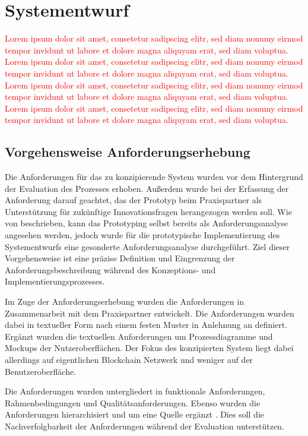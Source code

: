 \section{Systementwurf}
\textcolor{red}{Lorem ipsum dolor sit amet, consetetur sadipscing elitr, sed diam nonumy eirmod tempor invidunt ut labore et dolore magna aliquyam erat, sed diam voluptua. Lorem ipsum dolor sit amet, consetetur sadipscing elitr, sed diam nonumy eirmod tempor invidunt ut labore et dolore magna aliquyam erat, sed diam voluptua. Lorem ipsum dolor sit amet, consetetur sadipscing elitr, sed diam nonumy eirmod tempor invidunt ut labore et dolore magna aliquyam erat, sed diam voluptua. Lorem ipsum dolor sit amet, consetetur sadipscing elitr, sed diam nonumy eirmod tempor invidunt ut labore et dolore magna aliquyam erat, sed diam voluptua.}

\subsection{Vorgehensweise Anforderungserhebung}
Die Anforderungen für das zu konzipierende System wurden vor dem Hintergrund der Evaluation des Prozesses erhoben. Außerdem wurde bei der Erfassung der Anforderung darauf geachtet, das der Prototyp beim Praxispartner als Unterstützung für zukünftige Innovationsfragen herangezogen werden soll. Wie von \citet{Dick2017, HullElizabeth2011} beschrieben, kann das Prototyping selbst bereits als Anforderungsanalyse angesehen werden, jedoch wurde für die prototypische Implementierung des Systementwurfs eine gesonderte Anforderungsanalyse durchgeführt. Ziel dieser Vorgehensweise ist eine präzise Definition und Eingrenzung der Anforderungsbeschreibung während des Konzeptions- und Implementierungsprozesses.

Im Zuge der Anforderungserhebung wurden die Anforderungen in Zusammenarbeit mit dem Praxispartner entwickelt. Die Anforderungen wurden dabei in textueller Form nach einem festen Muster in Anlehnung an \citet{PohlKlaus2015} definiert. Ergänzt wurden die textuellen Anforderungen um Prozessdiagramme und Mockups der Nutzeroberflächen. Der Fokus des konzipierten System liegt dabei allerdings auf eigentlichen Blockchain Netzwerk und weniger auf der Benutzeroberfläche.

Die Anforderungen wurden untergliedert in funktionale Anforderungen, Rahmenbedingungen und Qualitätsanforderungen. Ebenso wurden die Anforderungen hierarchisiert und um eine Quelle ergänzt \citep{Koelsch2016}. Dies soll die Nachverfolgbarkeit der Anforderungen während der Evaluation unterstützen.

